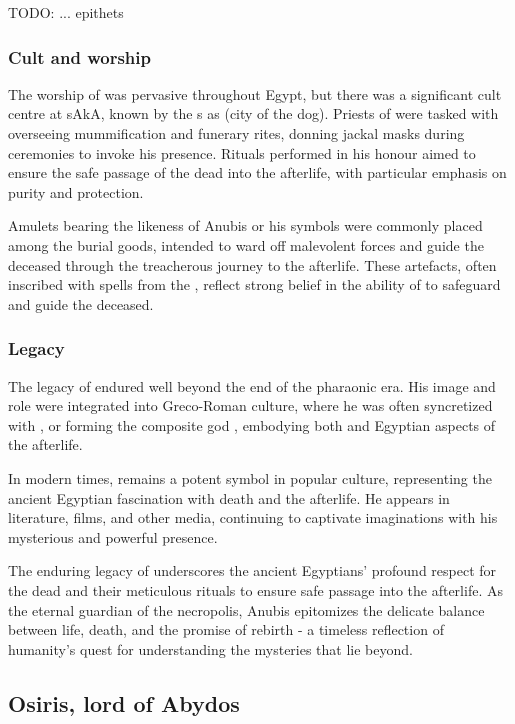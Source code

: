 TODO: ... epithets

\subsubsection*{Cult and worship}
The worship of  was pervasive throughout Egypt, but there was a significant cult centre at sAkA, known by the s as  (city of the dog). Priests of  were tasked with overseeing mummification and funerary rites, donning jackal masks during ceremonies to invoke his presence. Rituals performed in his honour aimed to ensure the safe passage of the dead into the afterlife, with particular emphasis on purity and protection.

Amulets bearing the likeness of Anubis or his symbols were commonly placed among the burial goods, intended to ward off malevolent forces and guide the deceased through the treacherous journey to the afterlife. These artefacts, often inscribed with spells from the , reflect strong belief in the ability of  to safeguard and guide the deceased.

\subsubsection*{Legacy}
The legacy of  endured well beyond the end of the pharaonic era. His image and role were integrated into Greco-Roman culture, where he was often syncretized with , or forming the composite god , embodying both  and Egyptian aspects of the afterlife.

In modern times,  remains a potent symbol in popular culture, representing the ancient Egyptian fascination with death and the afterlife. He appears in literature, films, and other media, continuing to captivate imaginations with his mysterious and powerful presence.

The enduring legacy of  underscores the ancient Egyptians' profound respect for the dead and their meticulous rituals to ensure safe passage into the afterlife. As the eternal guardian of the necropolis, Anubis epitomizes the delicate balance between life, death, and the promise of rebirth - a timeless reflection of humanity's quest for understanding the mysteries that lie beyond.

\subsection*{Osiris, lord of Abydos}

